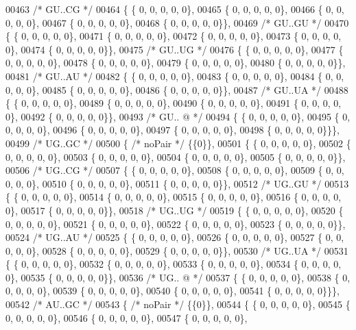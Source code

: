 \begin{DoxyCode}
00463  \textcolor{comment}{/* GU..CG */}
00464 \{ \{  0, 0, 0, 0, 0\},
00465 \{  0, 0, 0, 0, 0\},
00466 \{  0, 0, 0, 0, 0\},
00467 \{  0, 0, 0, 0, 0\},
00468 \{  0, 0, 0, 0, 0\}\},
00469  \textcolor{comment}{/* GU..GU */}
00470 \{ \{  0, 0, 0, 0, 0\},
00471 \{  0, 0, 0, 0, 0\},
00472 \{  0, 0, 0, 0, 0\},
00473 \{  0, 0, 0, 0, 0\},
00474 \{  0, 0, 0, 0, 0\}\},
00475  \textcolor{comment}{/* GU..UG */}
00476 \{ \{  0, 0, 0, 0, 0\},
00477 \{  0, 0, 0, 0, 0\},
00478 \{  0, 0, 0, 0, 0\},
00479 \{  0, 0, 0, 0, 0\},
00480 \{  0, 0, 0, 0, 0\}\},
00481  \textcolor{comment}{/* GU..AU */}
00482 \{ \{  0, 0, 0, 0, 0\},
00483 \{  0, 0, 0, 0, 0\},
00484 \{  0, 0, 0, 0, 0\},
00485 \{  0, 0, 0, 0, 0\},
00486 \{  0, 0, 0, 0, 0\}\},
00487  \textcolor{comment}{/* GU..UA */}
00488 \{ \{  0, 0, 0, 0, 0\},
00489 \{  0, 0, 0, 0, 0\},
00490 \{  0, 0, 0, 0, 0\},
00491 \{  0, 0, 0, 0, 0\},
00492 \{  0, 0, 0, 0, 0\}\},
00493  \textcolor{comment}{/* GU.. @ */}
00494 \{ \{  0, 0, 0, 0, 0\},
00495 \{  0, 0, 0, 0, 0\},
00496 \{  0, 0, 0, 0, 0\},
00497 \{  0, 0, 0, 0, 0\},
00498 \{  0, 0, 0, 0, 0\}\}\},
00499  \textcolor{comment}{/* UG..GC */}
00500 \{ \textcolor{comment}{/* noPair */} \{\{0\}\},
00501 \{ \{  0, 0, 0, 0, 0\},
00502 \{  0, 0, 0, 0, 0\},
00503 \{  0, 0, 0, 0, 0\},
00504 \{  0, 0, 0, 0, 0\},
00505 \{  0, 0, 0, 0, 0\}\},
00506  \textcolor{comment}{/* UG..CG */}
00507 \{ \{  0, 0, 0, 0, 0\},
00508 \{  0, 0, 0, 0, 0\},
00509 \{  0, 0, 0, 0, 0\},
00510 \{  0, 0, 0, 0, 0\},
00511 \{  0, 0, 0, 0, 0\}\},
00512  \textcolor{comment}{/* UG..GU */}
00513 \{ \{  0, 0, 0, 0, 0\},
00514 \{  0, 0, 0, 0, 0\},
00515 \{  0, 0, 0, 0, 0\},
00516 \{  0, 0, 0, 0, 0\},
00517 \{  0, 0, 0, 0, 0\}\},
00518  \textcolor{comment}{/* UG..UG */}
00519 \{ \{  0, 0, 0, 0, 0\},
00520 \{  0, 0, 0, 0, 0\},
00521 \{  0, 0, 0, 0, 0\},
00522 \{  0, 0, 0, 0, 0\},
00523 \{  0, 0, 0, 0, 0\}\},
00524  \textcolor{comment}{/* UG..AU */}
00525 \{ \{  0, 0, 0, 0, 0\},
00526 \{  0, 0, 0, 0, 0\},
00527 \{  0, 0, 0, 0, 0\},
00528 \{  0, 0, 0, 0, 0\},
00529 \{  0, 0, 0, 0, 0\}\},
00530  \textcolor{comment}{/* UG..UA */}
00531 \{ \{  0, 0, 0, 0, 0\},
00532 \{  0, 0, 0, 0, 0\},
00533 \{  0, 0, 0, 0, 0\},
00534 \{  0, 0, 0, 0, 0\},
00535 \{  0, 0, 0, 0, 0\}\},
00536  \textcolor{comment}{/* UG.. @ */}
00537 \{ \{  0, 0, 0, 0, 0\},
00538 \{  0, 0, 0, 0, 0\},
00539 \{  0, 0, 0, 0, 0\},
00540 \{  0, 0, 0, 0, 0\},
00541 \{  0, 0, 0, 0, 0\}\}\},
00542  \textcolor{comment}{/* AU..GC */}
00543 \{ \textcolor{comment}{/* noPair */} \{\{0\}\},
00544 \{ \{  0, 0, 0, 0, 0\},
00545 \{  0, 0, 0, 0, 0\},
00546 \{  0, 0, 0, 0, 0\},
00547 \{  0, 0, 0, 0, 0\},

\end{DoxyCode}

